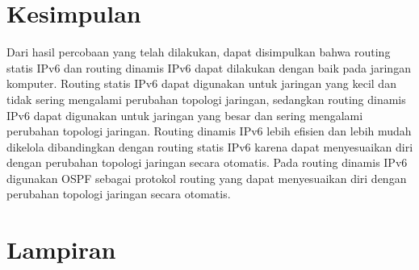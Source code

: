

\section{Kesimpulan}
Dari hasil percobaan yang telah dilakukan, dapat disimpulkan bahwa routing statis IPv6 dan routing dinamis IPv6
dapat dilakukan dengan baik pada jaringan komputer. Routing statis IPv6 dapat digunakan untuk jaringan yang
kecil dan tidak sering mengalami perubahan topologi jaringan, sedangkan routing dinamis IPv6 dapat digunakan untuk
jaringan yang besar dan sering mengalami perubahan topologi jaringan. Routing dinamis IPv6 lebih efisien dan lebih
mudah dikelola dibandingkan dengan routing statis IPv6 karena dapat menyesuaikan diri dengan perubahan topologi
jaringan secara otomatis. Pada routing dinamis IPv6 digunakan OSPF sebagai protokol routing yang dapat menyesuaikan diri
dengan perubahan topologi jaringan secara otomatis.
\section{Lampiran}

